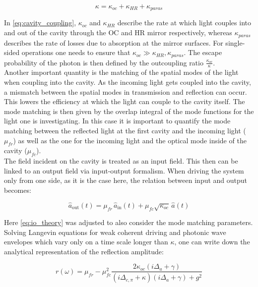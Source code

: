 \begin{equation}
	\kappa = \kappa_{oc} + \kappa_{HR} + \kappa_{paras}
	\label{eq:cavity_coupling}
\end{equation}

In \eqref{eq:cavity_coupling}, $\kappa_{oc}$ and $\kappa_{HR}$ describe the rate at which light couples into and out of the cavity through the OC and HR mirror respectively, whereas $\kappa_{paras}$ describes the rate of losses due to absorption at the mirror surfaces.
For single-sided operations one needs to ensure that $\kappa_{oc}\gg \kappa_{HR},\kappa_{paras}$. The escape probability of the photon is then defined by the outcoupling ratio $\frac{\kappa_{oc}}{\kappa}$.\\

Another important quantity is the matching of the spatial modes of the light when coupling into the cavity. As the incoming light gets coupled into the cavity, a mismatch between the spatial modes in transmission and reflection can occur. This lowers the efficiency at which the light can couple to the cavity itself. The mode matching is then given by the overlap integral of the mode functions for the light one is investigating. In this case it is important to quantify the mode matching between the reflected light at the first cavity and the incoming light ($\mu_{fr}$) as well as the one for the incoming light and the optical mode inside of the cavity ($\mu_{fc}$).\\

The field incident on the cavity is treated as an input field. This then can be linked to an output field via input-output formalism.
When driving the system only from one side, as it is the case here, the relation between input and output becomes:\cite{GardinerColletIO1985}

\begin{equation}
	\hat{a}_{\text{out}}(t) = \mu_{fr}\,\hat{a}_{\text{in}}(t) + \mu_{fc}\sqrt{\kappa_{oc}}\,\hat{a}(t)
	\label{eq:io_theory}
\end{equation}

Here \eqref{eq:io_theory} was adjusted to also consider the mode matching parameters. Solving Langevin equations for weak coherent driving and photonic wave envelopes which vary only on a time scale longer than $\kappa$, one can write down the analytical representation of the reflection amplitude\cite{HuEtAl2008,TieckeEtAl2014,DominikNThesis2021}:

\begin{equation}
	r(\omega) = \mu_{fr} - \mu_{fc}^2 \frac{2\kappa_{oc}(i\Delta_a + \gamma)}{(i\Delta_{c,\pi}+\kappa)(i\Delta_a+\gamma) + g^2}
	\label{eq:analytical_reflection}
\end{equation}

